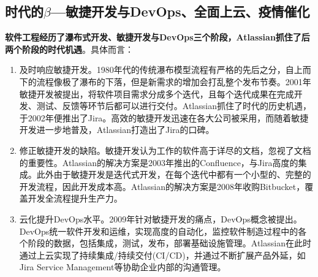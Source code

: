 \subsection{时代的\texorpdfstring{$\beta$}——敏捷开发与DevOps、全面上云、疫情催化}
\textbf{软件工程经历了瀑布式开发、敏捷开发与DevOps三个阶段，Atlassian抓住了后两个阶段的时代机遇}。具体而言：
\begin{enumerate}
    \item 及时响应敏捷开发。1980年代的传统瀑布模型流程有严格的先后之分，自上而下的流程像极了瀑布的下落，但是新需求的增加会打乱整个发布节奏。2001年敏捷开发被提出，将软件项目需求分成多个迭代，且每个迭代成果在完成开发、测试、反馈等环节后都可以进行交付。Atlassian抓住了时代的历史机遇，于2002年便推出了Jira。高效的敏捷开发迅速在各大公司被采用，而随着敏捷开发进一步地普及，Atlassian打造出了Jira的口碑。
    \item 修正敏捷开发的缺陷。敏捷开发认为工作的软件高于详尽的文档，忽视了文档的重要性。Atlassian的解决方案是2003年推出的Confluence，与Jira高度的集成。此外由于敏捷开发是迭代式开发，在每个迭代中都有一个小型的、完整的开发流程，因此开发成本高。Atlassian的解决方案是2008年收购Bitbucket，覆盖开发全流程提升生产力。
    \item 云化提升DevOps水平。2009年针对敏捷开发的痛点，DevOps概念被提出。DevOps统一软件开发和运维，实现高度的自动化，监控软件制造过程中的各个阶段的数据，包括集成，测试，发布，部署基础设施管理。Atlassian在此时通过上云实现了持续集成/持续交付(CI/CD)，并通过不断扩展产品外延，如Jira Service Management等协助企业内部的沟通管理。
\end{enumerate}
